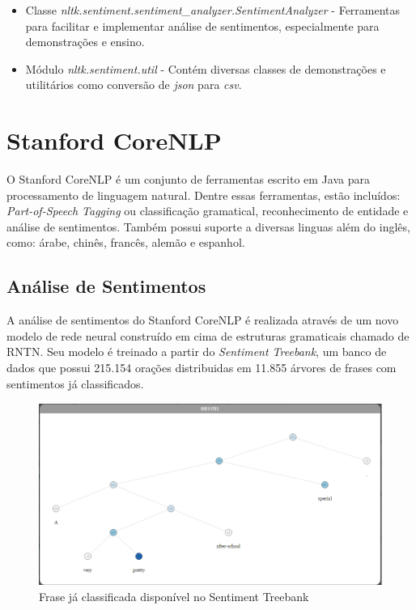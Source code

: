 \begin{itemize}
  \item Classe \textit{nltk.sentiment.sentiment\_analyzer.SentimentAnalyzer} -
  Ferramentas para facilitar e implementar análise de sentimentos,
  especialmente para demonstrações e ensino.
  \item Módulo \textit{nltk.sentiment.util} - Contém diversas classes de
  demonstrações e utilitários como conversão de \textit{json} para \textit{csv}.
\end{itemize}

\section{Stanford CoreNLP}

O Stanford CoreNLP é um conjunto de ferramentas escrito em Java para
processamento de linguagem natural. Dentre essas ferramentas, estão incluídos:
\textit{Part-of-Speech Tagging} ou classificação gramatical, reconhecimento de
entidade e análise de sentimentos. Também possui suporte a diversas linguas além
do inglês, como: árabe, chinês, francês, alemão e espanhol.

\subsection{Análise de Sentimentos}

A análise de sentimentos do Stanford CoreNLP é realizada através de um novo
modelo de rede neural construído em cima de estruturas gramaticais chamado de
\ac{RNTN}. Seu modelo é treinado a partir do \textit{Sentiment Treebank}, um
banco de dados que possui 215.154 orações distribuidas em 11.855 árvores de
frases com sentimentos já classificados.

\begin{figure}[htbp]
 \centering
 \includegraphics[height=225px]{imagens/corenlp.png}
 \caption{Frase já classificada disponível no Sentiment Treebank}
 \label{fig:corenlp}
\end{figure}

